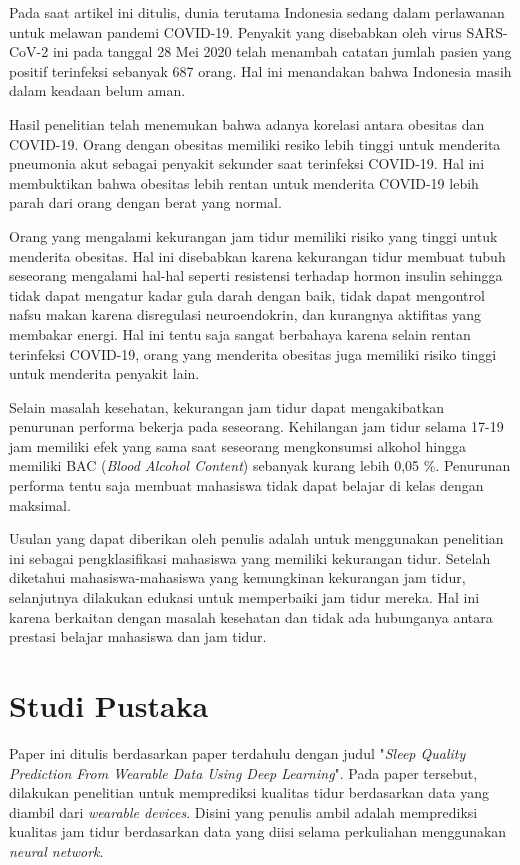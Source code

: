 \documentclass[12pt, a4paper, twoside]{article}
\begin{document}
Pada saat artikel ini ditulis, dunia terutama Indonesia sedang dalam perlawanan untuk melawan pandemi COVID-19. Penyakit yang disebabkan oleh virus SARS-CoV-2 ini pada tanggal 28 Mei 2020 telah menambah catatan jumlah pasien yang positif terinfeksi sebanyak 687 orang. Hal ini menandakan bahwa Indonesia masih dalam keadaan belum aman. \cite{Putri.2020} 

Hasil penelitian telah menemukan bahwa adanya korelasi antara obesitas dan COVID-19. Orang dengan obesitas memiliki resiko lebih tinggi untuk menderita pneumonia akut sebagai penyakit sekunder saat terinfeksi COVID-19. Hal ini membuktikan bahwa obesitas lebih rentan untuk menderita COVID-19 lebih parah dari orang dengan berat yang normal. \cite{Cai.2020}

Orang yang mengalami kekurangan jam tidur memiliki risiko yang tinggi untuk menderita obesitas. Hal ini disebabkan karena kekurangan tidur membuat tubuh seseorang mengalami hal-hal seperti resistensi terhadap hormon insulin sehingga tidak dapat mengatur kadar gula darah dengan baik, tidak dapat mengontrol nafsu makan karena disregulasi neuroendokrin, dan kurangnya aktifitas yang membakar energi. Hal ini tentu saja sangat berbahaya karena selain rentan terinfeksi COVID-19, orang
yang menderita obesitas juga memiliki risiko tinggi untuk menderita penyakit lain. \cite{Knutson.2007}

Selain masalah kesehatan, kekurangan jam tidur dapat mengakibatkan penurunan performa bekerja pada seseorang. Kehilangan jam tidur selama 17-19 jam memiliki efek yang sama saat seseorang mengkonsumsi alkohol hingga memiliki BAC (\textit{Blood Alcohol Content}) sebanyak kurang lebih 0,05 \%. Penurunan performa tentu saja membuat mahasiswa tidak dapat belajar di kelas dengan maksimal. \cite{Williamson.2000}

Usulan yang dapat diberikan oleh penulis adalah untuk menggunakan penelitian ini sebagai pengklasifikasi mahasiswa yang memiliki kekurangan tidur. Setelah diketahui mahasiswa-mahasiswa yang kemungkinan kekurangan jam tidur, selanjutnya dilakukan edukasi untuk memperbaiki jam tidur mereka. Hal ini karena berkaitan dengan masalah kesehatan dan tidak ada hubunganya antara prestasi belajar mahasiswa dan jam tidur. \cite{Sarfriyanda.2015}

\section{Studi Pustaka}
Paper ini ditulis berdasarkan paper terdahulu dengan judul "\textit{Sleep Quality Prediction From Wearable Data Using Deep Learning}". Pada paper tersebut, dilakukan penelitian untuk memprediksi kualitas tidur berdasarkan data yang diambil dari \textit{wearable devices}. Disini yang penulis ambil adalah memprediksi kualitas jam tidur berdasarkan data yang diisi selama perkuliahan menggunakan \textit{neural network}. \cite{Sathyanarayana.2016}
\end{document}
